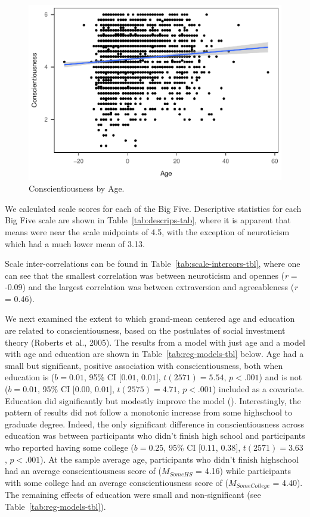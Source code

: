 \documentclass[
  man,floatsintext]{apa6}
\begin{document}
\begin{figure}
\centering
\includegraphics{papaja_example_ms_files/figure-latex/fig-ageXconsc-1.pdf}
\caption{\label{fig:fig-ageXconsc}Conscientiousness by Age.}
\end{figure}

We calculated scale scores for each of the Big Five. Descriptive statistics for each Big Five scale are shown in Table~\ref{tab:descrips-tab}, where it is apparent that means were near the scale midpoints of 4.5, with the exception of neuroticism which had a much lower mean of 3.13.

Scale inter-correlations can be found in Table~\ref{tab:scale-intercors-tbl}, where one can see that the smallest correlation was between neuroticism and opennes (\emph{r} = -0.09) and the largest correlation was between extraversion and agreeableness (\emph{r} = 0.46).

We next examined the extent to which grand-mean centered age and education are related to conscientiousness, based on the postulates of social investment theory (Roberts et al., 2005). The results from a model with just age and a model with age and education are shown in Table~\ref{tab:reg-models-tbl} below. Age had a small but significant, positive association with conscientiousness, both when education is (\(b = 0.01\), 95\% CI \([0.01\), \(0.01]\), \(t(2571) = 5.54\), \(p < .001\)) and is not (\(b = 0.01\), 95\% CI \([0.00\), \(0.01]\), \(t(2575) = 4.71\), \(p < .001\)) included as a covariate. Education did significantly but modestly improve the model (). Interestingly, the pattern of results did not follow a monotonic increase from some highschool to graduate degree. Indeed, the only significant difference in conscientiousness across education was between participants who didn't finish high school and participants who reported having some college (\(b = 0.25\), 95\% CI \([0.11\), \(0.38]\), \(t(2571) = 3.63\), \(p < .001\)). At the sample average age, participants who didn't finish highschool had an average conscientiousness score of (\(M_{SomeHS}\) = 4.16) while participants with some college had an average conscientiousness score of (\(M_{SomeCollege}\) = 4.40). The remaining effects of education were small and non-significant (see Table~\ref{tab:reg-models-tbl}).
\end{document}
